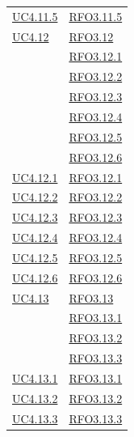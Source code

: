 \begin{longtable}{|>{\centering}m{5cm}|m{5cm}<{\centering}|}
\hyperref[UC4.11.5]{UC4.11.5} & \hyperlink{RFO3.11.5}{RFO3.11.5}\\

\hyperref[UC4.12]{UC4.12} & \hyperlink{RFO3.12}{RFO3.12}\\ & \hyperlink{RFO3.12.1}{RFO3.12.1}\\
& \hyperlink{RFO3.12.2}{RFO3.12.2}\\
& \hyperlink{RFO3.12.3}{RFO3.12.3}\\
& \hyperlink{RFO3.12.4}{RFO3.12.4}\\
& \hyperlink{RFO3.12.5}{RFO3.12.5}\\
& \hyperlink{RFO3.12.6}{RFO3.12.6}\\ \hline

\hyperref[UC4.12.1]{UC4.12.1} & \hyperlink{RFO3.12.1}{RFO3.12.1}\\ \hline
\hyperref[UC4.12.2]{UC4.12.2} & \hyperlink{RFO3.12.2}{RFO3.12.2}\\ \hline
\hyperref[UC4.12.3]{UC4.12.3} & \hyperlink{RFO3.12.3}{RFO3.12.3}\\ \hline
\hyperref[UC4.12.4]{UC4.12.4} & \hyperlink{RFO3.12.4}{RFO3.12.4}\\ \hline
\hyperref[UC4.12.5]{UC4.12.5} & \hyperlink{RFO3.12.5}{RFO3.12.5}\\ \hline
\hyperref[UC4.12.6]{UC4.12.6} & \hyperlink{RFO3.12.6}{RFO3.12.6}\\ \hline

\hyperref[UC4.13]{UC4.13} & \hyperlink{RFO3.13}{RFO3.13}\\ & \hyperlink{RFO3.13.1}{RFO3.13.1}\\
& \hyperlink{RFO3.13.2}{RFO3.13.2}\\
& \hyperlink{RFO3.13.3}{RFO3.13.3}\\ \hline

\hyperref[UC4.13.1]{UC4.13.1} & \hyperlink{RFO3.13.1}{RFO3.13.1}\\ \hline
\hyperref[UC4.13.2]{UC4.13.2} & \hyperlink{RFO3.13.2}{RFO3.13.2}\\ \hline
\hyperref[UC4.13.3]{UC4.13.3} & \hyperlink{RFO3.13.3}{RFO3.13.3}\\ \hline


\end{longtable}
